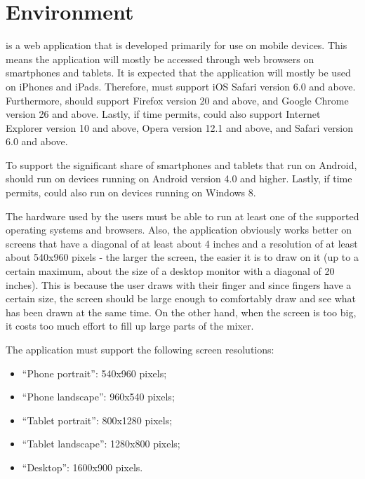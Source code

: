 \section{Environment}
\label{sec:env}
\projectname{} is a web application that is developed primarily for use on mobile devices. This means the application will mostly be accessed through web browsers on smartphones and tablets. It is expected that the application will mostly be used on iPhones and iPads. Therefore, \projectname{} must support iOS Safari version 6.0 and above. Furthermore, \projectname{} should support Firefox version 20 and above, and Google Chrome version 26 and above. Lastly, if time permits, \projectname{} could also support Internet Explorer version 10 and above, Opera version 12.1 and above, and Safari version 6.0 and above.

To support the significant share of smartphones and tablets that run on Android, \projectname{} should run on devices running on Android version 4.0 and higher. Lastly, if time permits, \projectname{} could also run on devices running on Windows 8.

The hardware used by the users must be able to run at least one of the supported operating systems and browsers. Also, the application obviously works better on screens that have a diagonal of at least about 4 inches and a resolution of at least about 540x960 pixels - the larger the screen, the easier it is to draw on it (up to a certain maximum, about the size of a desktop monitor with a diagonal of 20 inches). This is because the user draws with their finger and since fingers have a certain size, the screen should be large enough to comfortably draw and see what has been drawn at the same time. On the other hand, when the screen is too big, it costs too much effort to fill up large parts of the mixer.

The application must support the following screen resolutions:
\begin{itemize}
	\item ``Phone portrait'': 540x960 pixels;
	\item ``Phone landscape'': 960x540 pixels;
	\item ``Tablet portrait'': 800x1280 pixels;
	\item ``Tablet landscape'': 1280x800 pixels;
	\item ``Desktop'': 1600x900 pixels.
\end{itemize}

